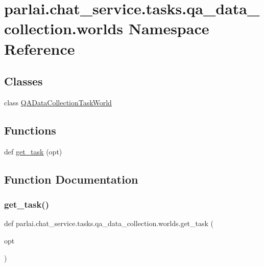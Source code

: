 \hypertarget{namespaceparlai_1_1chat__service_1_1tasks_1_1qa__data__collection_1_1worlds}{}\section{parlai.\+chat\+\_\+service.\+tasks.\+qa\+\_\+data\+\_\+collection.\+worlds Namespace Reference}
\label{namespaceparlai_1_1chat__service_1_1tasks_1_1qa__data__collection_1_1worlds}
\subsection*{Classes}
\begin{DoxyCompactItemize}
\item 
class \hyperlink{classparlai_1_1chat__service_1_1tasks_1_1qa__data__collection_1_1worlds_1_1QADataCollectionTaskWorld}{Q\+A\+Data\+Collection\+Task\+World}
\end{DoxyCompactItemize}
\subsection*{Functions}
\begin{DoxyCompactItemize}
\item 
def \hyperlink{namespaceparlai_1_1chat__service_1_1tasks_1_1qa__data__collection_1_1worlds_a2e51acfa39bb591f618ea3716f7d35e0}{get\+\_\+task} (opt)
\end{DoxyCompactItemize}


\subsection{Function Documentation}
\mbox{\label{namespaceparlai_1_1chat__service_1_1tasks_1_1qa__data__collection_1_1worlds_a2e51acfa39bb591f618ea3716f7d35e0}} 
\subsubsection{\texorpdfstring{get\+\_\+task()}{get\_task()}}
{\footnotesize\ttfamily def parlai.\+chat\+\_\+service.\+tasks.\+qa\+\_\+data\+\_\+collection.\+worlds.\+get\+\_\+task (\begin{DoxyParamCaption}\item[{}]{opt }\end{DoxyParamCaption})}

